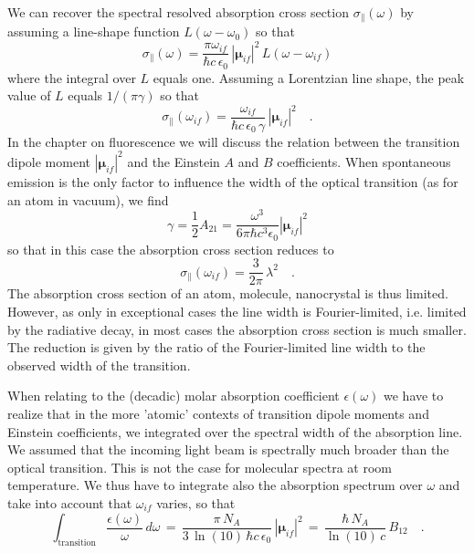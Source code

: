 We can recover the spectral resolved absorption cross section $\sigma_{\parallel}(\omega)$ by assuming a line-shape function $L(\omega - \omega_0)$ so that 
\begin{equation}
 \sigma_{\parallel}(\omega) =  \frac{\pi \omega_{if}}{ \hbar c \, \epsilon_0} \,
 |\mathbf{\mu}_{if} |^2 \, L(\omega - \omega_{if})
\end{equation}
where the integral over $L$ equals one. Assuming a Lorentzian line shape, the peak value of $L$ equals $1/(\pi \gamma)$ so that
\begin{equation}
 \sigma_{\parallel}(\omega_{if}) =  \frac{\omega_{if}}{ \hbar c \, \epsilon_0 \, \gamma} \,
 |\mathbf{\mu}_{if} |^2  \quad .
\end{equation}
In the chapter on fluorescence we will discuss the relation between the transition dipole moment $|\mathbf{\mu}_{if} |^2 $ and the Einstein $A$ and $B$ coefficients. When spontaneous emission is the only factor to influence the width of the optical transition (as for an atom in vacuum), we find
\begin{equation}
 \gamma = \frac{1}{2} A_{21} = \frac{\omega^3}{6 \pi \hbar c^3 \epsilon_0} |\mathbf{\mu}_{if} |^2  
\end{equation}
so that in this case the absorption cross section reduces to 
\begin{equation}
 \sigma_{\parallel}(\omega_{if}) =  \frac{3}{2 \pi} \, \lambda^2 \quad .
\end{equation}
The absorption cross section of an atom, molecule, nanocrystal is thus limited. However, as only in exceptional cases the line width is Fourier-limited, i.e. limited by the radiative decay, in most cases the absorption cross section is much smaller. The reduction is given by the ratio of the Fourier-limited line width to the observed width of the transition. 


When relating to the  (decadic) molar absorption coefficient $\epsilon(\omega)$ we have to realize that in the more 'atomic' contexts of transition dipole moments and Einstein coefficients, we integrated over the spectral width of the absorption line. We  assumed that the incoming light beam is spectrally much broader than the optical transition. This is not the case for molecular spectra at room temperature. We thus have to integrate also the absorption spectrum over $\omega$ and take into account that $\omega_{if}$ varies, so that
\begin{equation}
 \int_{\text{transition}} \frac{\epsilon(\omega)}{\omega} \, d \omega \, = \, 
  \frac{\pi \, N_A}{ 3 \, \ln(10) \, \hbar c \, \epsilon_0} \,
 |\mathbf{\mu}_{if} |^2
 \, = \, 
  \frac{\hbar\, N_A}{ \ln(10) \, c } \,
B_{12}  \quad .
\end{equation}

